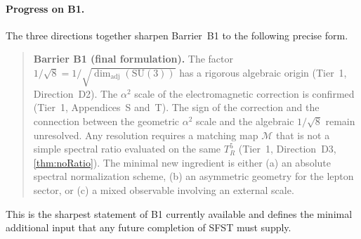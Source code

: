 \paragraph{Progress on B1.}
The three directions together sharpen Barrier~B1 to the following
precise form.

\begin{quote}
\textbf{Barrier B1 (final formulation).}
The factor $1/\sqrt{8} = 1/\sqrt{\dim_{\mathrm{adj}}(\mathrm{SU}(3))}$
has a rigorous algebraic origin (Tier~1, Direction~D2).
The $\alpha^2$ scale of the electromagnetic correction is confirmed
(Tier~1, Appendices~S and~T).
The sign of the correction and the connection between the geometric
$\alpha^2$ scale and the algebraic $1/\sqrt{8}$ remain unresolved.
Any resolution requires a matching map $\mathcal{M}$ that is not a
simple spectral ratio evaluated on the same $T^5_R$ (Tier~1,
Direction~D3, \cref{thm:noRatio}).
The minimal new ingredient is either (a) an absolute spectral
normalization scheme, (b) an asymmetric geometry for the lepton
sector, or (c) a mixed observable involving an external scale.
\end{quote}

This is the sharpest statement of B1 currently available and defines
the minimal additional input that any future completion of SFST must
supply.

